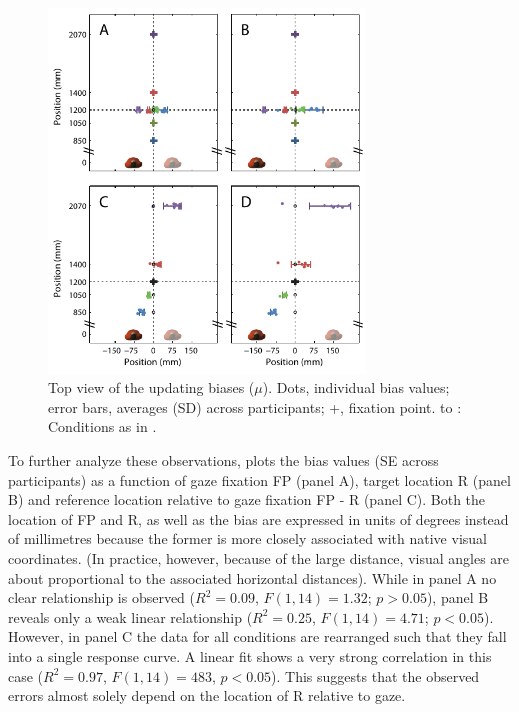 \begin{figure}
    \includegraphics[width=0.75\textwidth]{src/paper2/figure3.pdf}

    \caption{Top view of the updating biases ($\mu$). Dots, individual bias values; error bars, averages (\textpm SD) across participants; +, fixation point.  to : Conditions as in .}

    \label{p2:fig3}
\end{figure}

To further analyze these observations,  plots the bias values ({\textpm}SE across participants) as a function of gaze fixation FP (panel A), target location R (panel B) and reference location relative to gaze fixation FP - R (panel C). Both the location of FP and R, as well as the bias are expressed in units of degrees instead of millimetres because the former is more closely associated with native visual coordinates. (In practice, however, because of the large distance, visual angles are about proportional to the associated horizontal distances). While in panel A no clear relationship is observed ($R^2 = 0.09$, $F(1,14) = 1.32$; $p > 0.05$), panel B reveals only a weak linear relationship ($R^2 = 0.25$, $F(1,14) = 4.71$; $p < 0.05$). However, in panel C the data for all conditions are rearranged such that they fall into a single response curve. A linear fit shows a very strong correlation in this case ($R^2 = 0.97$, $F(1,14) = 483$, $p < 0.05$). This suggests that the observed errors almost solely depend on the location of R relative to gaze.

